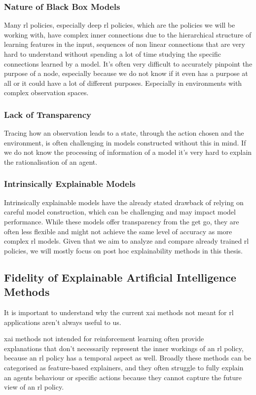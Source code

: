\documentclass[UKenglish]{uiomasterthesis}
\begin{document}
\subsubsection{Nature of Black Box Models}
Many \ac{rl} policies, especially deep \ac{rl} policies, which are the policies we will be working with, have complex inner connections due to the hierarchical structure of learning features in the input, sequences of non linear connections that are very hard to understand without spending a lot of time studying the specific connections learned by a model. It's often very difficult to accurately pinpoint the purpose of a node, especially because we do not know if it even has a purpose at all or it could have a lot of different purposes. Especially in environments with complex observation spaces.


\subsubsection{Lack of Transparency}
Tracing how an observation leads to a state, through the action chosen and the environment, is often challenging in models constructed without this in mind. If we do not know the processing of information of a model it's very hard to explain the rationalisation of an agent.

\subsubsection{Intrinsically Explainable Models}
Intrinsically explainable models have the already stated drawback of relying on careful model construction, which can be challenging and may impact model performance. While these models offer transparency from the get go, they are often less flexible and might not achieve the same level of accuracy as more complex \ac{rl} models. Given that we aim to analyze and compare already trained \ac{rl} policies, we will mostly focus on post hoc explainability methods in this thesis.

\medskip

\subsection{Fidelity of Explainable Artificial Intelligence Methods}
It is important to understand why the current \ac{xai} methods not meant for \ac{rl} applications aren't always useful to us.

\ac{xai} methods not intended for reinforcement learning often provide\\ explanations that don't necessarily represent the inner workings of an \ac{rl} policy, because an \ac{rl} policy has a temporal aspect as well. Broadly these methods can be categorised as feature-based explainers, and they often struggle to fully explain an agents behaviour or specific actions because they cannot capture the future view of an \ac{rl} policy. 
\end{document}
